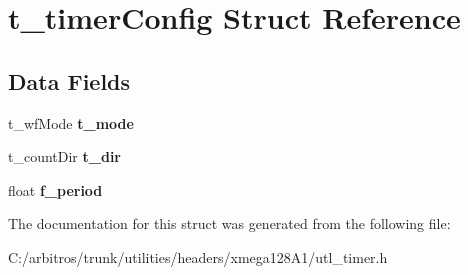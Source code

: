 \hypertarget{structt__timer_config}{\section{t\-\_\-timer\-Config Struct Reference}
\label{structt__timer_config}
}
\subsection*{Data Fields}
\begin{DoxyCompactItemize}
\item 
\hypertarget{structt__timer_config_abc6ed7ce52e463e4c1d366b53056242e}{t\-\_\-wf\-Mode {\bfseries t\-\_\-mode}}\label{structt__timer_config_abc6ed7ce52e463e4c1d366b53056242e}

\item 
\hypertarget{structt__timer_config_a27e49b2dff9b861e48bc96ba4392abfc}{t\-\_\-count\-Dir {\bfseries t\-\_\-dir}}\label{structt__timer_config_a27e49b2dff9b861e48bc96ba4392abfc}

\item 
\hypertarget{structt__timer_config_a286f6ae04fff2fa94407d82970644e4f}{float {\bfseries f\-\_\-period}}\label{structt__timer_config_a286f6ae04fff2fa94407d82970644e4f}

\end{DoxyCompactItemize}


The documentation for this struct was generated from the following file\-:\begin{DoxyCompactItemize}
\item 
C\-:/arbitros/trunk/utilities/headers/xmega128\-A1/utl\-\_\-timer.\-h\end{DoxyCompactItemize}
